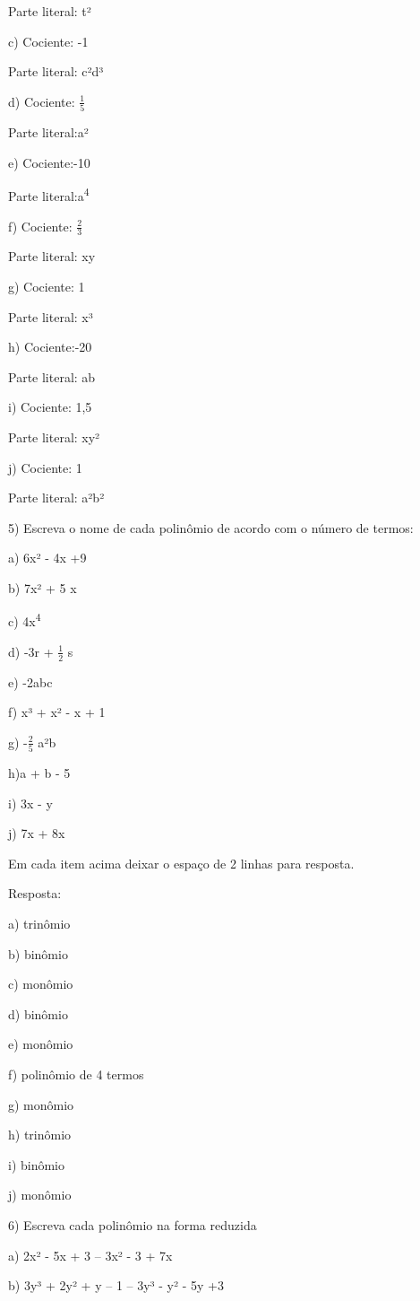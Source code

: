 Parte literal: t²

c) Cociente: -1

Parte literal: c²d³

d) Cociente: \(\frac{1}{5}\)

Parte literal:a²

e) Cociente:-10

Parte literal:a\textsuperscript{4}

f) Cociente: \(\frac{2}{3}\)

Parte literal: xy

g) Cociente: 1

Parte literal: x³

h) Cociente:-20

Parte literal: ab

i) Cociente: 1,5

Parte literal: xy²

j) Cociente: 1

Parte literal: a²b²

5) Escreva o nome de cada polinômio de acordo com o número de termos:

a) 6x² - 4x +9

b) 7x² + 5 x

c) 4x\textsuperscript{4}

d) -3r + \(\frac{1}{2}\) s

e) -2abc

f) x³ + x² - x + 1

g) -\(\frac{2}{5}\) a²b

h)a + b - 5

i) 3x - y

j) 7x + 8x

Em cada item acima deixar o espaço de 2 linhas para resposta.

Resposta:

a) trinômio

b) binômio

c) monômio

d) binômio

e) monômio

f) polinômio de 4 termos

g) monômio

h) trinômio

i) binômio

j) monômio

6) Escreva cada polinômio na forma reduzida

a) 2x² - 5x + 3 -- 3x² - 3 + 7x

b) 3y³ + 2y² + y -- 1 -- 3y³ - y² - 5y +3

